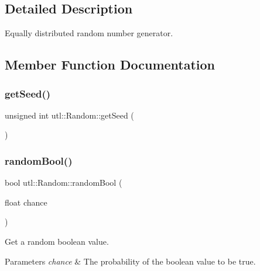 \subsection{Detailed Description}
Equally distributed random number generator. 

\subsection{Member Function Documentation}
\mbox{\label{classutl_1_1_random_a88abb8994dd315ddc0d44707752f4150}} 
\subsubsection{\texorpdfstring{get\+Seed()}{getSeed()}}
{\footnotesize\ttfamily unsigned int utl\+::\+Random\+::get\+Seed (\begin{DoxyParamCaption}{ }\end{DoxyParamCaption})\hspace{0.3cm}{\ttfamily [static]}}

\mbox{\label{classutl_1_1_random_a946070e88d52bb580038257acfe81b1c}} 
\subsubsection{\texorpdfstring{random\+Bool()}{randomBool()}}
{\footnotesize\ttfamily bool utl\+::\+Random\+::random\+Bool (\begin{DoxyParamCaption}\item[{float}]{chance }\end{DoxyParamCaption})\hspace{0.3cm}{\ttfamily [static]}}

Get a random boolean value. 
\begin{DoxyParams}{Parameters}
{\em chance} & The probability of the boolean value to be true. \\
\hline
\end{DoxyParams}
\mbox{\label{classutl_1_1_random_a984348e7f72f1e6f57de11ac984c4544}} 

